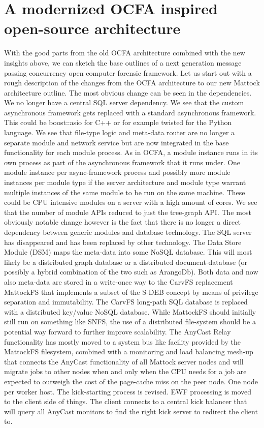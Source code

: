 \section{A modernized OCFA inspired open-source architecture}
With the good parts from the old OCFA architecture combined with the new insights above, we can sketch the base outlines of a next generation message passing concurrency open computer forensic framework. Let us start out with a rough description of the changes from the OCFA architecture to our new Mattock architecture outline. The most obvious change can be seen in the dependencies. We no longer have a central SQL server dependency.  We see that the custom asynchronous framework gets replaced with a standard asynchronous framework. This could be boost::asio for C++ or for example twisted for the Python language. We see that file-type logic and meta-data router are no longer a separate module and network service but are now integrated in the base functionality for each module process. As in OCFA, a module instance runs in its own process as part of the asynchronous framework that it runs under. One module instance per async-framework process and possibly more module instances per module type if the server architecture and module type warrant multiple instances of the same module to be run on the same machine.  These could be CPU intensive modules on a server with a high amount of cores. 
We see that the number of module APIs reduced to just the tree-graph API.  The most obviously notable change however is the fact that there is no longer a direct dependency between generic modules and database technology. The SQL server has disappeared and has been replaced by other technology. The Data Store Module (DSM) maps the meta-data into some NoSQL database. This will most likely be a distributed graph-database or a distributed document-database (or possibly a hybrid combination of the two such as ArangoDb). Both data and now also meta-data are stored in a write-once way to the CarvFS replacement MattockFS that implements a subset of the S-DEB concept by means of privilege separation and immutability. The CarvFS long-path SQL database is replaced with a distributed key/value NoSQL database. While MattockFS should initially still run on something like SNFS, the use of a distributed file-system should be a potential way forward to further improve scalability. The AnyCast Relay functionality has mostly moved to a system bus like facility provided by the MattockFS filesystem, combined with a monitoring and load balancing mesh-up that connects the AnyCast functionality of all Mattock server nodes and will migrate jobs to other nodes when and only when the CPU needs for a job are expected to outweigh the cost of the page-cache miss on the peer node. One node per worker host. The kick-starting process is revised. EWF processing is moved to the client side of things. The client connects to a central kick balancer that will query all AnyCast monitors to find the right kick server to redirect the client to. 
